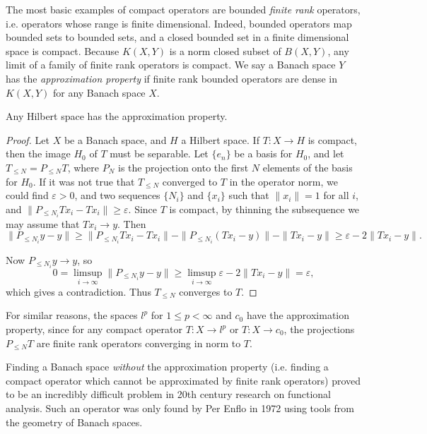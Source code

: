 The most basic examples of compact operators are bounded \emph{finite rank} operators, i.e. operators whose range is finite dimensional. Indeed, bounded operators map bounded sets to bounded sets, and a closed bounded set in a finite dimensional space is compact. Because $K(X,Y)$ is a norm closed subset of $B(X,Y)$, any limit of a family of finite rank operators is compact. We say a Banach space $Y$ has the \emph{approximation property} if finite rank bounded operators are dense in $K(X,Y)$ for any Banach space $X$.

\begin{theorem}
    Any Hilbert space has the approximation property.
\end{theorem}
\begin{proof}
    Let $X$ be a Banach space, and $H$ a Hilbert space. If $T: X \to H$ is compact, then the image $H_0$ of $T$ must be separable. Let $\{ e_n \}$ be a basis for $H_0$, and let $T_{\leq N} = P_{\leq N} T$, where $P_N$ is the projection onto the first $N$ elements of the basis for $H_0$. If it was not true that $T_{\leq N}$ converged to $T$ in the operator norm, we could find $\varepsilon > 0$, and two sequences $\{ N_i \}$ and $\{ x_i \}$ such that $\| x_i \| = 1$ for all $i$, and $\| P_{\leq N_i} T x_i - T x_i \| \geq \varepsilon$. Since $T$ is compact, by thinning the subsequence we may assume that $Tx_i \to y$. Then
    \[ \| P_{\leq N_i} y - y \| \geq \| P_{\leq N_i} Tx_i - Tx_i \| - \| P_{\leq N_i} (Tx_i - y) \| - \| Tx_i - y \| \geq \varepsilon - 2 \| Tx_i - y \|. \]

    Now $P_{\leq N_i} y \to y$, so
    \[ 0 = \limsup_{i \to \infty} \| P_{\leq N_i} y - y \| \geq \limsup_{i \to \infty} \varepsilon - 2 \| Tx_i - y \| = \varepsilon, \]
    which gives a contradiction. Thus $T_{\leq N}$ converges to $T$.
\end{proof}

For similar reasons, the spaces $l^p$ for $1 \leq p < \infty$ and $c_0$ have the approximation property, since for any compact operator $T: X \to l^p$ or $T: X \to c_0$, the projections $P_{\leq N} T$ are finite rank operators converging in norm to $T$.

\begin{remark}
    Finding a Banach space \emph{without} the approximation property (i.e. finding a compact operator which cannot be approximated by finite rank operators) proved to be an incredibly difficult problem in 20th century research on functional analysis. Such an operator was only found by Per Enflo in 1972 using tools from the geometry of Banach spaces.
\end{remark}

